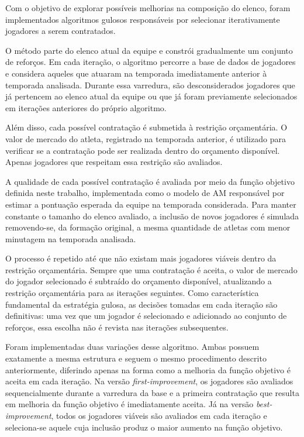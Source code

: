 Com o objetivo de explorar possíveis melhorias na composição do elenco, foram implementados algoritmos gulosos responsáveis por selecionar iterativamente 
jogadores a serem contratados.

O método parte do elenco atual da equipe e constrói gradualmente um conjunto de reforços. Em cada iteração, o algoritmo percorre a base de dados 
de jogadores e considera aqueles que atuaram na temporada imediatamente anterior à temporada analisada. Durante essa varredura, são desconsiderados 
jogadores que já pertencem ao elenco atual da equipe ou que já foram previamente selecionados em iterações anteriores do próprio algoritmo.

Além disso, cada possível contratação é submetida à restrição orçamentária. O valor de mercado do atleta, registrado na temporada anterior, é utilizado 
para verificar se a contratação pode ser realizada dentro do orçamento disponível. Apenas jogadores que respeitam essa restrição são avaliados.

A qualidade de cada possível contratação é avaliada por meio da função objetivo definida neste trabalho, implementada como o modelo de AM responsável 
por estimar a pontuação esperada da equipe na temporada considerada. Para manter constante o tamanho do elenco avaliado, a inclusão de novos jogadores 
é simulada removendo-se, da formação original, a mesma quantidade de atletas com menor minutagem na temporada analisada.

O processo é repetido até que não existam mais jogadores viáveis dentro da restrição orçamentária. Sempre que uma contratação é aceita, o valor 
de mercado do jogador selecionado é subtraído do orçamento disponível, atualizando a restrição orçamentária para as iterações seguintes. 
Como característica fundamental da estratégia gulosa, as decisões tomadas em cada iteração são definitivas: uma vez que um jogador é selecionado e 
adicionado ao conjunto de reforços, essa escolha não é revista nas iterações subsequentes.

Foram implementadas duas variações desse algoritmo. Ambas possuem exatamente a mesma estrutura e seguem o mesmo procedimento descrito anteriormente, 
diferindo apenas na forma como a melhoria da função objetivo é aceita em cada iteração. Na versão \textit{first-improvement}, os jogadores são avaliados 
sequencialmente durante a varredura da base e a primeira contratação que resulta em melhoria da função objetivo é imediatamente aceita. 
Já na versão \textit{best-improvement}, todos os jogadores viáveis são avaliados em cada iteração e seleciona-se aquele cuja inclusão 
produz o maior aumento na função objetivo.

